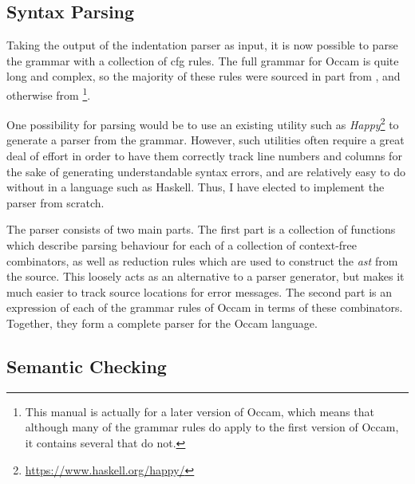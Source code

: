 \subsection{Syntax Parsing} \label{design-parser}

Taking the output of the indentation parser as input, it is now possible to
parse the grammar with a collection of \gls{cfg} rules. The full grammar for
Occam is quite long and complex, so the majority of these rules were sourced in
part from \cite[p.~124]{jones}, and otherwise from
\cite[p.~106]{occ21}\footnote{This manual is actually for a later version of
Occam, which means that although many of the grammar rules do apply to the first
version of Occam, it contains several that do not.}.

One possibility for parsing would be to use an existing utility such as
\textit{Happy}\footnote{\url{https://www.haskell.org/happy/}} to generate a
parser from the grammar. However, such utilities often require a great deal of
effort in order to have them correctly track line numbers and columns for the
sake of generating understandable syntax errors, and are relatively easy to do
without in a language such as Haskell. Thus, I have elected to implement the
parser from scratch.

The parser consists of two main parts. The first part is a collection of
functions which describe parsing behaviour for each of a collection of
context-free \gls{combinator}s, as well as reduction rules which are used to
construct the \textit{\gls{ast}} from the source. This loosely acts as an
alternative to a parser generator, but makes it much easier to track source
locations for error messages. The second part is an expression of each of the
grammar rules of Occam in terms of these combinators. Together, they form
a complete parser for the Occam language.

\subsection{Semantic Checking}

